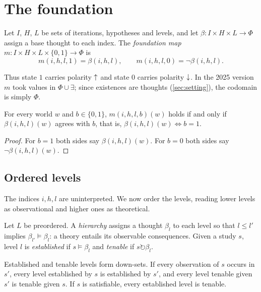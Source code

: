 \section{The foundation}\label{sec:foundation}

\begin{definition}
Let $I$, $H$, $L$ be sets of iterations, hypotheses and levels, and let
$\beta:I\times H\times L\to\Phi$ assign a base thought to each index. The \emph{foundation map}
$m:I\times H\times L\times\{0,1\}\to\Phi$ is
\[
  m(i,h,l,1)=\beta(i,h,l),\qquad m(i,h,l,0)=\neg\beta(i,h,l).
\]
\end{definition}

Thus state $1$ carries polarity ${\uparrow}$ and state $0$ carries polarity ${\downarrow}$. In the 2025 version
$m$ took values in $\Phi\cup\exists$; since existences are thoughts (\cref{sec:setting}), the
codomain is simply $\Phi$.

\begin{proposition}\label{prop:m}
For every world $w$ and $b\in\{0,1\}$, $m(i,h,l,b)(w)$ holds if and only if $\beta(i,h,l)(w)$
agrees with $b$, that is, $\beta(i,h,l)(w)\iff b=1$.
\end{proposition}

\begin{proof}
For $b=1$ both sides say $\beta(i,h,l)(w)$. For $b=0$ both sides say $\neg\beta(i,h,l)(w)$.
\end{proof}

\subsection{Ordered levels}\label{sec:levels}

The indices $i,h,l$ are uninterpreted. We now order the levels, reading lower levels as
observational and higher ones as theoretical.

\begin{definition}[Hierarchy]\label{def:hierarchy}
Let $L$ be preordered. A \emph{hierarchy} assigns a thought $\beta_l$ to each level so that
$l\le l'$ implies $\beta_{l'}\models\beta_l$: a theory entails its observable consequences. Given
a study $s$, level $l$ is \emph{established} if $s\models\beta_l$ and \emph{tenable} if
$s\circlearrowright\beta_l$.
\end{definition}

\begin{theorem}\label{thm:upward}
Established and tenable levels form down-sets. If every observation of $s$ occurs in $s'$, every
level established by $s$ is established by $s'$, and every level tenable given $s'$ is tenable
given $s$. If $s$ is satisfiable, every established level is tenable.
\end{theorem}

